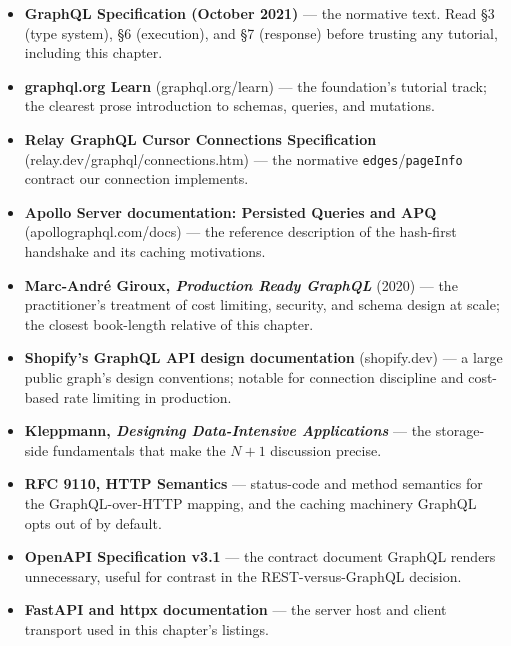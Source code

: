 \begin{itemize}
  \item \textbf{GraphQL Specification (October 2021)} \cite{graphqlspec}
        --- the normative text. Read \S3 (type system), \S6 (execution),
        and \S7 (response) before trusting any tutorial, including this
        chapter.
  \item \textbf{graphql.org Learn} (graphql.org/learn) --- the
        foundation's tutorial track; the clearest prose introduction to
        schemas, queries, and mutations.
  \item \textbf{Relay GraphQL Cursor Connections Specification}
        (relay.dev/graphql/connections.htm) --- the normative
        \texttt{edges}/\texttt{pageInfo} contract our connection
        implements.
  \item \textbf{Apollo Server documentation: Persisted Queries and APQ}
        (apollographql.com/docs) --- the reference description of the
        hash-first handshake and its caching motivations.
  \item \textbf{Marc-Andr\'e Giroux, \emph{Production Ready GraphQL}}
        (2020) --- the practitioner's treatment of cost limiting,
        security, and schema design at scale; the closest book-length
        relative of this chapter.
  \item \textbf{Shopify's GraphQL API design documentation}
        (shopify.dev) --- a large public graph's design conventions;
        notable for connection discipline and cost-based rate limiting in
        production.
  \item \textbf{Kleppmann, \emph{Designing Data-Intensive Applications}}
        \cite{kleppmann2017ddia} --- the storage-side fundamentals that
        make the $N{+}1$ discussion precise.
  \item \textbf{RFC 9110, HTTP Semantics} \cite{rfc9110} --- status-code
        and method semantics for the GraphQL-over-HTTP mapping, and the
        caching machinery GraphQL opts out of by default.
  \item \textbf{OpenAPI Specification v3.1} \cite{openapi31} --- the
        contract document GraphQL renders unnecessary, useful for
        contrast in the REST-versus-GraphQL decision.
  \item \textbf{FastAPI and httpx documentation}
        \cite{fastapidocs,httpxdocs} --- the server host and client
        transport used in this chapter's listings.
\end{itemize}

